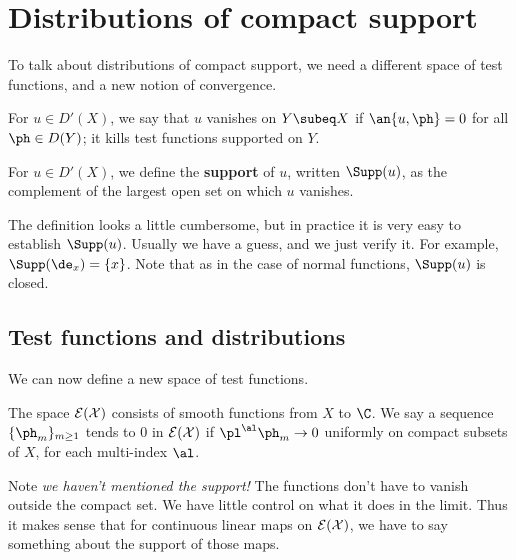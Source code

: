 \chapter{Distributions of compact support}

To talk about distributions of compact support, we need a different space of test functions, and a new notion of convergence.

For $u\in D'(X)$, we say that $u$ vanishes on $Y\subeq X$ if $\an{u,\ph}=0$ for all $\ph\in D(Y)$; it kills test functions supported on $Y$.

\begin{df}
For $u\in D'(X)$, we define the \textbf{support} of $u$, written $\Supp(u)$, as the complement of the largest open set on which $u$ vanishes.
\end{df}
The definition looks a little cumbersome, but in practice it is very easy to establish $\Supp(u)$. Usually we have a guess, and we just verify it. For example, $\Supp(\de_x)=\{x\}$. Note that as in the case of normal functions, $\Supp(u)$ is closed.

\section{Test functions and distributions}
We can now define a new space of test functions. 
\begin{df}
The space $\cal E(X)$ consists of smooth functions from $X$ to $\C$. We say a sequence $\{\ph_m\}_{m\ge 1}$ tends to 0 in $\cal E(X)$ if $\pl^{\al}\ph_m\to 0$ uniformly on compact subsets of $X$, for each multi-index $\al$. 
\end{df}
Note {\it we haven't mentioned the support!} The functions don't have to vanish outside the compact set. We have little control on what it does in the limit. Thus it makes sense that for continuous linear maps on $\cal E(X)$, we have to say something about the support of those maps.

